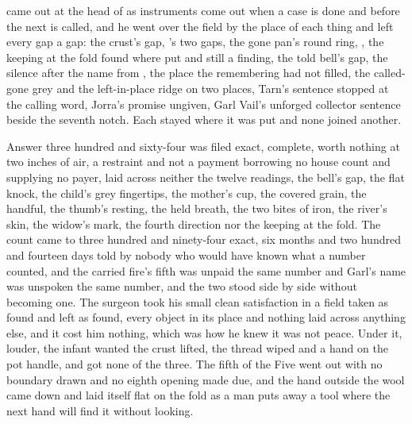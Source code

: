  came out at the head of  as instruments come out when a case is done and before the next is called, and he went over the field by the place of each thing and left every gap a gap: the crust's gap, 's two gaps, the gone pan's round ring, , the keeping at the fold found where put and still a finding, the told bell's gap, the silence after the name from , the place the remembering had not filled, the called-gone grey and the left-in-place ridge on two places, Tarn's sentence stopped at the calling word, Jorra's promise ungiven, Garl Vail's unforged collector sentence beside the seventh notch. Each stayed where it was put and none joined another.

Answer three hundred and sixty-four was filed exact, complete, worth nothing at two inches of air, a restraint and not a payment borrowing no house count and supplying no payer, laid across neither the twelve readings, the bell's gap, the flat knock, the child's grey fingertips, the mother's cup, the covered grain, the handful, the thumb's resting, the held breath, the two bites of iron, the river's skin, the widow's mark, the fourth direction nor the keeping at the fold. The count came to three hundred and ninety-four exact, six months and two hundred and fourteen days told by nobody who would have known what a number counted, and the carried fire's fifth was unpaid the same number and Garl's name was unspoken the same number, and the two stood side by side without becoming one. The surgeon took his small clean satisfaction in a field taken as found and left as found, every object in its place and nothing laid across anything else, and it cost him nothing, which was how he knew it was not peace. Under it, louder, the infant wanted the crust lifted, the thread wiped and a hand on the pot handle, and got none of the three. The fifth of the Five went out with no boundary drawn and no eighth opening made due, and the hand outside the wool came down and laid itself flat on the fold as a man puts away a tool where the next hand will find it without looking.
